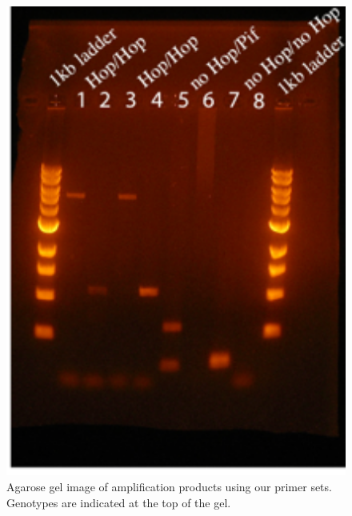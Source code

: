 \documentclass[12pt]{article}
\begin{document}
\begin{figure}[!t]
  \begin{center}
   \includegraphics[width=150mm]{FigS2Gel.png}
    \caption{Agarose gel image of amplification products using our primer sets. Genotypes are indicated at the top of the gel.} 
\label{FigS2Gel}
  \end{center}
\end{figure}
\end{document}
